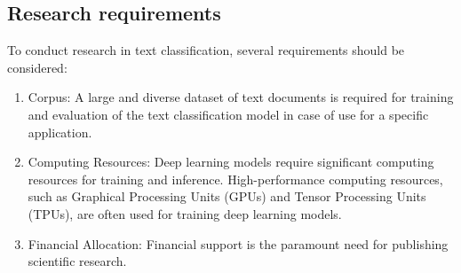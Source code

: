 \subsection{Research requirements}
To conduct research in text classification, several requirements should be considered:

\begin{enumerate}
\item Corpus: A large and diverse dataset of text documents is required for training and evaluation of the text classification model in case of use for a specific application. 
\item Computing Resources: Deep learning models require significant computing resources for training and inference. High-performance computing resources, such as Graphical Processing Units (GPUs) and Tensor Processing Units (TPUs), are often used for training deep learning models.
\item Financial Allocation: Financial support is the paramount need for publishing scientific research.
\end{enumerate}